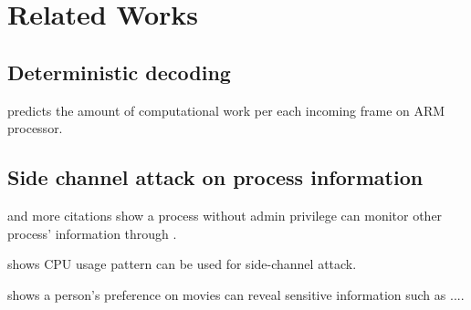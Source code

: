 \section{Related Works}
\label{sec:relatedworks}

\subsection{Deterministic decoding}
\cite{DVFS}  predicts the amount of computational work per each incoming frame on ARM processor.

\subsection{Side channel attack on process information}
\cite{MEMENTO} and more citations show a process without admin privilege can monitor other process' information through . 

shows CPU usage pattern can be used for side-channel attack. 

shows a person's preference on movies can reveal sensitive information such as ....
